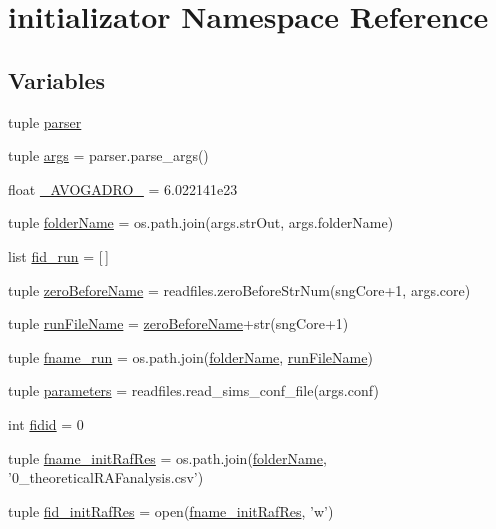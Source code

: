 \hypertarget{a00135}{\section{initializator Namespace Reference}
\label{a00135}
}
\subsection*{Variables}
\begin{DoxyCompactItemize}
\item 
tuple \hyperlink{a00135_af2659789ba1896029e3ab9bfbf83d019}{parser}
\item 
tuple \hyperlink{a00135_aedb2e5b77a354ccd69d9d38b3c30f61a}{args} = parser.\-parse\-\_\-args()
\item 
float \hyperlink{a00135_a01b3b6a0972397f230c35bd2fb8effc4}{\-\_\-\-A\-V\-O\-G\-A\-D\-R\-O\-\_\-} = 6.\-022141e23
\item 
tuple \hyperlink{a00135_aa51c106700ef9afbdb94a1c800e10569}{folder\-Name} = os.\-path.\-join(args.\-str\-Out, args.\-folder\-Name)
\item 
list \hyperlink{a00135_a6015a676cc06fdae98b1cca15d92b883}{fid\-\_\-run} = \mbox{[}$\,$\mbox{]}
\item 
tuple \hyperlink{a00135_a475e51ace78f2490aa4206915d0e3ae6}{zero\-Before\-Name} = readfiles.\-zero\-Before\-Str\-Num(sng\-Core+1, args.\-core)
\item 
tuple \hyperlink{a00135_a47868487619848c8ead2458c6855426a}{run\-File\-Name} = \hyperlink{a00135_a475e51ace78f2490aa4206915d0e3ae6}{zero\-Before\-Name}+str(sng\-Core+1)
\item 
tuple \hyperlink{a00135_a6bc5100ec1c6492cec974172df243857}{fname\-\_\-run} = os.\-path.\-join(\hyperlink{a00135_aa51c106700ef9afbdb94a1c800e10569}{folder\-Name}, \hyperlink{a00135_a47868487619848c8ead2458c6855426a}{run\-File\-Name})
\item 
tuple \hyperlink{a00135_a646de756d594b9a0eebf18c4eb9ee0d6}{parameters} = readfiles.\-read\-\_\-sims\-\_\-conf\-\_\-file(args.\-conf)
\item 
int \hyperlink{a00135_afdd976dc87dc056c8cba6926f9f98287}{fidid} = 0
\item 
tuple \hyperlink{a00135_a139a15a6b4127dd23049cb2b91a85d77}{fname\-\_\-init\-Raf\-Res} = os.\-path.\-join(\hyperlink{a00135_aa51c106700ef9afbdb94a1c800e10569}{folder\-Name}, '0\-\_\-theoretical\-R\-A\-Fanalysis.\-csv')
\item 
tuple \hyperlink{a00135_a2f15742bdb2c2cebe65c8e9730915e28}{fid\-\_\-init\-Raf\-Res} = open(\hyperlink{a00135_a139a15a6b4127dd23049cb2b91a85d77}{fname\-\_\-init\-Raf\-Res}, 'w')

\end{DoxyCompactItemize}
